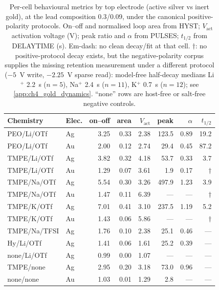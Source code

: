 \begin{table}[t]
  \centering
  \caption[Electrode-contrast per-cell metrics]{Per-cell behavioural metrics by top electrode (active silver vs inert gold), at the lead composition \num{0.3}/\num{0.09}, under the canonical positive-polarity protocols. On--off and normalised loop area from HYST; \(V_{\mathrm{act}}\) activation voltage (V); peak ratio and \(\alpha\) from PULSES; \(t_{1/2}\) from DELAYTIME (s). Em-dash: no clean decay/fit at that cell. \(\dagger\): no positive-protocol decay exists, but the negative-polarity corpus supplies the missing retention measurement under a different protocol (\(-5\)~V write, \(-2.25\)~V sparse read): model-free half-decay medians Li\(^{+}\) \SI{2.2}{\second} (\(n=5\)), Na\(^{+}\) \SI{2.4}{\second} (\(n=11\)), K\(^{+}\) \SI{0.7}{\second} (\(n=12\)); see \cref{app:ch4_gold_dynamics}. ``none'' rows are host-free or salt-free negative controls.}
  \label{tab:ch4_electrode_by_cell}
  \footnotesize
  \setlength{\tabcolsep}{4pt}
  \begin{tabular}{llrrrrrr}
    \toprule
    Chemistry & Elec. & on--off & area & \(V_{\mathrm{act}}\) & peak & \(\alpha\) & \(t_{1/2}\) \\
    \midrule
    PEO/Li/OTf  & Ag & 3.25 & 0.33 & 2.38 & 123.5 & 0.89 & 19.2 \\
    PEO/Li/OTf  & Au & 2.00 & 0.12 & 2.74 & 29.4  & 0.45 & 87.2 \\
    TMPE/Li/OTf & Ag & 3.82 & 0.32 & 4.18 & 53.7  & 0.33 & 3.7 \\
    TMPE/Li/OTf & Au & 1.29 & 0.07 & 3.61 & 1.9   & 0.17 & \(\dagger\) \\
    TMPE/Na/OTf & Ag & 5.54 & 0.30 & 3.26 & 497.9 & 1.23 & 3.9 \\
    TMPE/Na/OTf & Au & 1.47 & 0.11 & 6.39 & ---   & ---  & \(\dagger\) \\
    TMPE/K/OTf  & Ag & 7.01 & 0.41 & 3.10 & 237.5 & 1.19 & 5.2 \\
    TMPE/K/OTf  & Au & 1.43 & 0.06 & 5.86 & ---   & ---  & \(\dagger\) \\
    TMPE/Na/TFSI& Ag & 1.76 & 0.10 & 2.38 & 25.1  & 0.46 & --- \\
    Hy/Li/OTf   & Ag & 1.41 & 0.06 & 1.61 & 25.2  & 0.39 & --- \\
    none/Li/OTf & Ag & 0.99 & 0.00 & 1.07 & ---   & ---  & --- \\
    TMPE/none   & Ag & 2.95 & 0.20 & 3.18 & 73.0  & 0.96 & --- \\
    none/none   & Au & 1.03 & 0.01 & 1.29 & 2.8   & ---  & --- \\
    \bottomrule
  \end{tabular}
\end{table}

